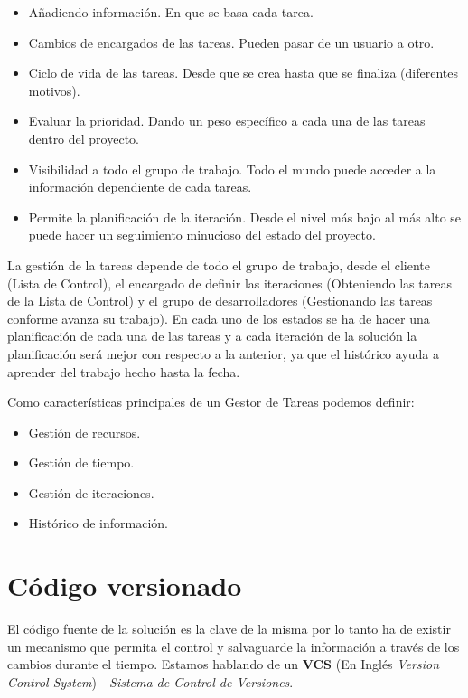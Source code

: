 \begin{itemize}
	\item Añadiendo información. En que se basa cada tarea.
	\item Cambios de encargados de las tareas. Pueden pasar de un usuario a otro.
	\item Ciclo de vida de las tareas. Desde que se crea hasta que se finaliza (diferentes motivos).
	\item Evaluar la prioridad. Dando un peso específico a cada una de las tareas dentro del proyecto.
	\item Visibilidad a todo el grupo de trabajo. Todo el mundo puede acceder a la información dependiente de cada tareas.
	\item Permite la planificación de la iteración. Desde el nivel más bajo al más alto se puede hacer un seguimiento minucioso del estado del proyecto.
\end{itemize}

\par La gestión de la tareas depende de todo el grupo de trabajo, desde el cliente (Lista de Control), el encargado de definir las iteraciones (Obteniendo las tareas de la Lista de Control) y el grupo de desarrolladores (Gestionando las tareas conforme avanza su trabajo). En cada uno de los estados se ha de hacer una planificación de cada una de las tareas y a cada iteración de la solución la planificación será mejor con respecto a la anterior, ya que el histórico ayuda a aprender del trabajo hecho hasta la fecha.

\par Como características principales de un Gestor de Tareas podemos definir:

\begin{itemize}
	\item Gestión de recursos.
	\item Gestión de tiempo.
	\item Gestión de iteraciones.
	\item Histórico de información.
\end{itemize}


\section{Código versionado}
\label{sec:codigo-versionado}

\par El código fuente de la solución es la clave de la misma por lo tanto ha de existir un mecanismo que permita el control y salvaguarde la información a través de los cambios durante el tiempo. Estamos hablando de un \textbf{VCS} (En Inglés \emph{Version Control System}) - \emph{Sistema de Control de Versiones}.

